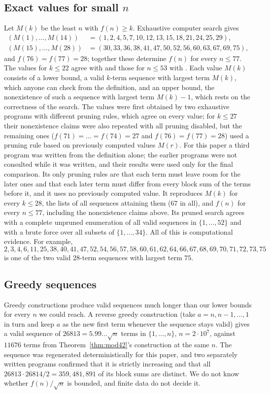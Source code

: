\documentclass[11pt]{amsart}
\theoremstyle{remark}
\begin{document}
\subsection*{Exact values for small $n$}
Let $M(k)$ be the least $n$ with $f(n)\ge k$. Exhaustive computer search gives
\begin{align*}
  (M(1),\dots,M(14))&=(1,2,4,5,7,10,12,13,15,18,21,24,25,29),\\
  (M(15),\dots,M(28))&=(30,33,36,38,41,47,50,52,56,60,63,67,69,75),
\end{align*}
and $f(76)=f(77)=28$; together these determine $f(n)$ for every $n\le77$. The values for $k\le22$ agree with \cite{OEISA364132} and
those for $n\le53$ with \cite{chy4pro}. Each value $M(k)$ consists of a lower bound, a valid $k$-term sequence with largest term $M(k)$,
which anyone can check from the definition, and an upper bound, the nonexistence of such a sequence with largest term $M(k)-1$, which
rests on the correctness of the search. The values were first obtained by two exhaustive programs with different pruning rules,
which agree on every value; for $k\le27$ their nonexistence claims were also repeated with all pruning disabled, but the remaining ones
($f(71)=\dots=f(74)=27$ and $f(76)=f(77)=28$) used a pruning rule based on previously computed values $M(r)$. For this paper a third
program was written from the definition alone; the earlier programs were not consulted while it was written, and their results were
used only for the final comparison. Its
only pruning rules are that each term must leave room for the later ones and that each later term must differ from every block sum of
the terms before it, and it uses no previously computed value. It reproduces $M(k)$ for every $k\le28$, the lists of all sequences
attaining them ($67$ in all), and $f(n)$ for every $n\le77$, including the nonexistence claims above. Its pruned search agrees with a
complete unpruned enumeration of all valid sequences in $\{1,\dots,52\}$ and with a brute force over all subsets of $\{1,\dots,34\}$.
All of this is computational evidence. For example,
\[
  2,3,4,6,11,25,38,40,41,47,52,54,56,57,58,60,61,62,64,66,67,68,69,70,71,72,73,75
\]
is one of the two valid $28$-term sequences with largest term $75$.

\subsection*{Greedy sequences}
Greedy constructions produce valid sequences much longer than our lower bounds for every $n$ we could reach. A reverse greedy
construction (take $a=n,n-1,\dots,1$ in turn and keep $a$ as the new first term whenever the sequence stays valid) gives a valid sequence of $26813=5.99\ldots\sqrt n$ terms in $\{1,\dots,n\}$, $n=2\cdot10^7$, against $11676$ terms from
Theorem~\ref{thm:mod42}'s construction at the same $n$. The sequence was regenerated deterministically for this paper, and two separately
written programs confirmed that it is strictly increasing and that all $26813\cdot26814/2=359{,}481{,}891$ of its block sums are distinct. We do not know whether $f(n)/\sqrt n$ is bounded, and finite data do not decide it.
\end{document}
